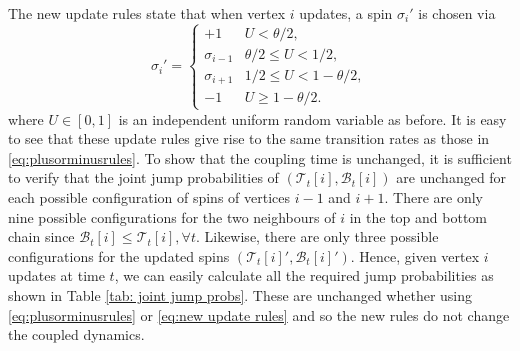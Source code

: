 	The new update rules state that when vertex $i$ updates, a spin $\sigma_i'$ is chosen via
	\begin{equation}
	\label{eq:new update rules}
		\sigma_i' = \begin{cases}
			+1 & U < \theta/2,\\
			\sigma_{i-1} & \theta/2 \leq U < 1/2,\\
			\sigma_{i+1} & 1/2 \leq U < 1 - \theta/2,\\
			-1 & U \geq 1 - \theta/2.
		\end{cases}
	\end{equation}
	where $U \in [0,1]$ is an independent uniform random variable as before. It is easy to see that these update rules give rise to the same transition rates as those in \eqref{eq:plusorminusrules}. To show that the coupling time is unchanged, it is sufficient to verify that the joint jump probabilities of $(\mathscr{T}_t[i], \mathscr{B}_t[i])$ are unchanged for each possible configuration of spins of vertices $i-1$ and $i+1$. There are only nine possible configurations for the two neighbours of $i$ in the top and bottom chain since $\mathscr{B}_t[i] \leq \mathscr{T}_t[i], \forall t$. Likewise, there are only three possible configurations for the updated spins $(\mathscr{T}_t[i]', \mathscr{B}_t[i]')$. Hence, given vertex $i$ updates at time $t$, we can easily calculate all the required jump probabilities as shown in Table \ref{tab: joint jump probs}. These are unchanged whether using \eqref{eq:plusorminusrules} or \eqref{eq:new update rules} and so the new rules do not change the coupled dynamics.

